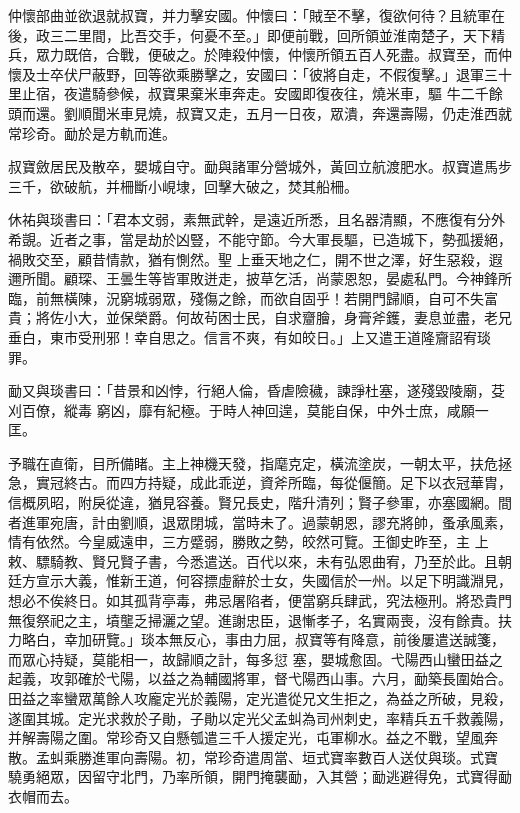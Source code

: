 \begin{pinyinscope}
 仲懷部曲並欲退就叔寶，并力擊安國。仲懷曰：「賊至不擊，復欲何待？且統軍在後，政三二里間，比吾交手，何憂不至。」即便前戰，回所領並淮南楚子，天下精兵，眾力既倍，合戰，便破之。於陣殺仲懷，仲懷所領五百人死盡。叔寶至，而仲懷及士卒伏尸蔽野，回等欲乘勝擊之，安國曰：「彼將自走，不假復擊。」退軍三十里止宿，夜遣騎參候，叔寶果棄米車奔走。安國即復夜往，燒米車，驅
 牛二千餘頭而還。劉順聞米車見燒，叔寶又走，五月一日夜，眾潰，奔還壽陽，仍走淮西就常珍奇。勔於是方軌而進。



 叔寶斂居民及散卒，嬰城自守。勔與諸軍分營城外，黃回立航渡肥水。叔寶遣馬步三千，欲破航，并柵斷小峴埭，回擊大破之，焚其船柵。



 休祐與琰書曰：「君本文弱，素無武幹，是遠近所悉，且名器清顯，不應復有分外希覬。近者之事，當是劫於凶豎，不能守節。今大軍長驅，已造城下，勢孤援絕，禍敗交至，顧昔情款，猶有惻然。聖
 上垂天地之仁，開不世之澤，好生惡殺，遐邇所聞。顧琛、王曇生等皆軍敗迸走，披草乞活，尚蒙恩恕，晏處私門。今神鋒所臨，前無橫陳，況窮城弱眾，殘傷之餘，而欲自固乎！若開門歸順，自可不失富貴；將佐小大，並保榮爵。何故茍困士民，自求齏膾，身膏斧鑊，妻息並盡，老兄垂白，東市受刑邪！幸自思之。信言不爽，有如皎日。」上又遣王道隆齎詔宥琰罪。



 勔又與琰書曰：「昔景和凶悖，行絕人倫，昏虐險穢，諫諍杜塞，遂殘毀陵廟，芟刈百僚，縱毒
 窮凶，靡有紀極。于時人神回遑，莫能自保，中外士庶，咸願一匡。



 予職在直衛，目所備睹。主上神機天發，指麾克定，橫流塗炭，一朝太平，扶危拯急，實冠終古。而四方持疑，成此乖逆，資斧所臨，每從偃簡。足下以衣冠華胄，信概夙昭，附戾從違，猶見容養。賢兄長史，階升清列；賢子參軍，亦塞國網。間者進軍宛唐，計由劉順，退眾閉城，當時未了。過蒙朝恩，謬充將帥，蚤承風素，情有依然。今皇威遠申，三方蹙弱，勝敗之勢，皎然可覽。王御史昨至，主
 上敕、驃騎教、賢兄賢子書，今悉遣送。百代以來，未有弘恩曲宥，乃至於此。且朝廷方宣示大義，惟新王道，何容摽虛辭於士女，失國信於一州。以足下明識淵見，想必不俟終日。如其孤背亭毒，弗忌屠陷者，便當窮兵肆武，究法極刑。將恐貴門無復祭祀之主，墳壟乏掃灑之望。進謝忠臣，退慚孝子，名實兩喪，沒有餘責。扶力略白，幸加研覽。」琰本無反心，事由力屈，叔寶等有降意，前後屢遣送誠箋，而眾心持疑，莫能相一，故歸順之計，每多愆
 塞，嬰城愈固。弋陽西山蠻田益之起義，攻郭確於弋陽，以益之為輔國將軍，督弋陽西山事。六月，勔築長圍始合。田益之率蠻眾萬餘人攻龐定光於義陽，定光遣從兄文生拒之，為益之所破，見殺，遂圍其城。定光求救於子勛，子勛以定光父孟虯為司州刺史，率精兵五千救義陽，并解壽陽之圍。常珍奇又自懸瓠遣三千人援定光，屯軍柳水。益之不戰，望風奔散。孟虯乘勝進軍向壽陽。初，常珍奇遣周當、垣式寶率數百人送仗與琰。式寶
 驍勇絕眾，因留守北門，乃率所領，開門掩襲勔，入其營；勔逃避得免，式寶得勔衣帽而去。




\end{pinyinscope}
